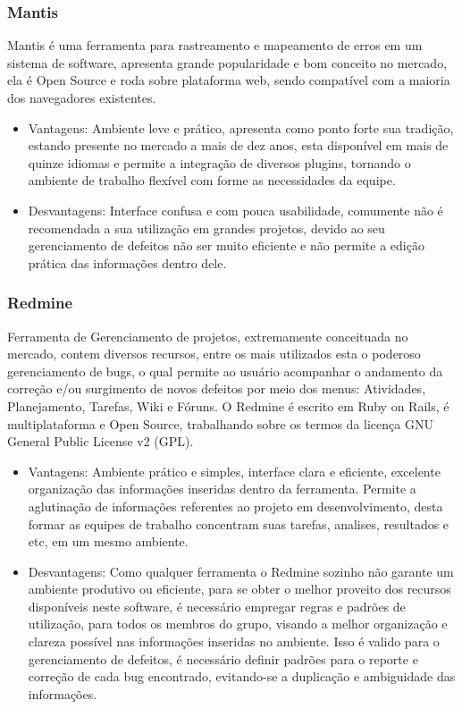 \documentclass[12pt,a4paper]{article}
\begin{document}
		\subsubsection{Mantis}
		
			Mantis é uma ferramenta para rastreamento e mapeamento de erros em um sistema de software, 
			apresenta grande popularidade e bom conceito no mercado, ela é Open Source e roda sobre plataforma web, 
			sendo compatível com a maioria dos navegadores existentes.

				\begin{itemize}
					\item Vantagens: 
						Ambiente leve e prático, apresenta como ponto forte sua tradição, estando presente no mercado a mais de dez anos, 
					  esta disponível em mais de quinze idiomas e permite a integração de diversos plugins, tornando o ambiente de trabalho flexível
					  com forme as necessidades da equipe. 					
					\item Desvantagens:
						Interface confusa e com pouca usabilidade, comumente não é recomendada a sua utilização em grandes projetos, 
						devido ao seu gerenciamento de defeitos não ser muito eficiente e não permite a edição prática das informações dentro dele. 
				\end{itemize}
						
		\subsubsection{Redmine}
		
			 Ferramenta de Gerenciamento de projetos, extremamente conceituada no mercado, contem diversos recursos, 
			 entre os mais utilizados esta o poderoso gerenciamento de bugs, o qual permite ao usuário acompanhar o 
			 andamento da correção e/ou surgimento de novos defeitos por meio dos menus: Atividades, Planejamento, Tarefas, Wiki e Fóruns.
			 O Redmine é escrito em Ruby on Rails, é multiplataforma e Open Source, trabalhando sobre os termos da licença GNU
			 General Public License v2 (GPL).
			 
			 \begin{itemize}
			 	\item Vantagens:
			 		Ambiente prático e simples, interface clara e eficiente, excelente organização das informações inseridas dentro da ferramenta. Permite a aglutinação de informações referentes ao projeto em desenvolvimento, desta formar as equipes de trabalho  concentram suas tarefas, analises, resultados e etc, em um mesmo ambiente. 
			 	\item Desvantagens:
			 		Como qualquer ferramenta o Redmine sozinho não garante um ambiente produtivo ou eficiente, para se obter o melhor proveito dos recursos disponíveis neste software, é necessário empregar regras e padrões de utilização, para todos os membros do grupo, visando a melhor organização e clareza possível nas informações inseridas no ambiente. Isso é valido para o gerenciamento de defeitos, é necessário definir padrões para o reporte e correção de cada bug encontrado, evitando-se a duplicação e ambiguidade das informações. 
			 \end{itemize}
			 
\end{document}
